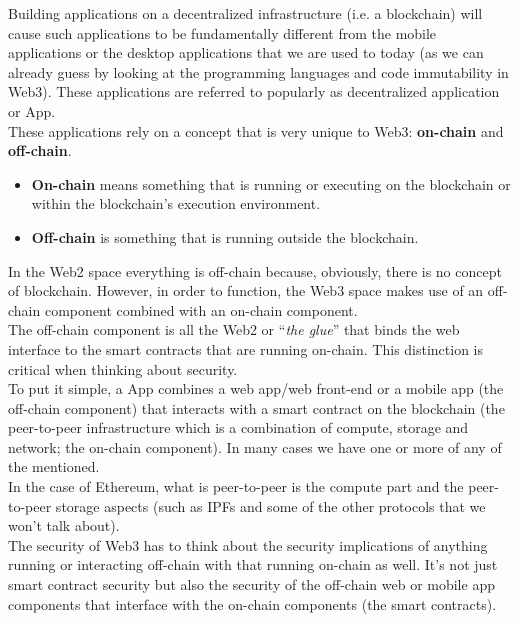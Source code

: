 Building applications on a decentralized infrastructure (i.e. a blockchain) will cause such applications to be fundamentally different from the mobile applications or the desktop applications that we are used to today (as we can already guess by looking at the programming languages and code immutability in Web3).
These applications are referred to popularly as decentralized application or \DJ App.\\

These applications rely on a concept that is very unique to Web3: \textbf{on-chain} and \textbf{off-chain}.

\begin{itemize}
    
    \item\textbf{On-chain} means something that is running or executing on the blockchain or within the blockchain's execution environment.
    
    \item\textbf{Off-chain} is something that is running outside the blockchain.

\end{itemize}

In the Web2 space everything is off-chain because, obviously, there is no concept of blockchain.
However, in order to function, the Web3 space makes use of an off-chain component combined with an on-chain component.\\

The off-chain component is all the Web2 or ``\textit{the glue}'' that binds the web interface to the smart contracts that are running on-chain.
This distinction is critical when thinking about security.\\

To put it simple, a \DJ App combines a web app/web front-end or a mobile app (the off-chain component) that interacts with a smart contract on the blockchain (the peer-to-peer infrastructure which is a combination of compute, storage and network; the on-chain component).
In many cases we have one or more of any of the mentioned.\\

In the case of Ethereum, what is peer-to-peer is the compute part and the peer-to-peer storage aspects (such as IPFs and some of the other protocols that we won't talk about).\\

The security of Web3 has to think about the security implications of anything running or interacting off-chain with that running on-chain as well.
It's not just smart contract security but also the security of the off-chain web or mobile app components that interface with the on-chain components (the smart contracts).\\

